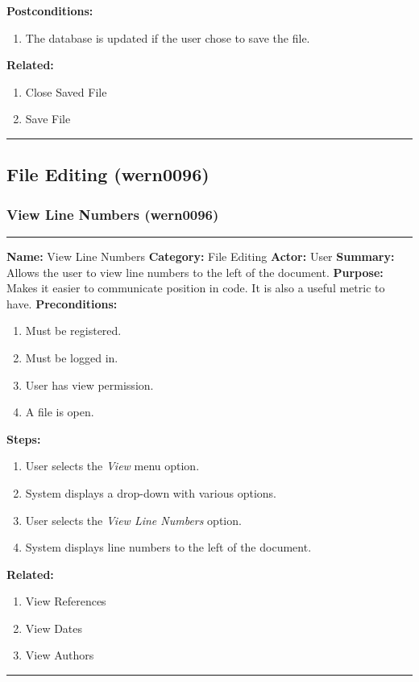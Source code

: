 \documentclass[11pt]{report}
\begin{document}
	\textbf{Postconditions:}
	\begin{enumerate}
		\item The database is updated if the user chose to save the file.
	\end{enumerate}
	\textbf{Related:}
	\begin{enumerate}
		\item Close Saved File
		\item Save File
	\end{enumerate}
\vspace{8pt}
\hrule
\newpage


\subsection{File Editing (wern0096)}
\subsubsection{View Line Numbers (wern0096)}
\vspace{2pt}
\hrule
\vspace{8pt}
	\noindent\textbf{Name:} View Line Numbers \newline
	\textbf{Category:} File Editing \newline
	\textbf{Actor:} User \newline
	\textbf{Summary:} Allows the user to view line numbers to the left of the document. \newline
	\textbf{Purpose:} Makes it easier to communicate position in code. It is also a useful metric to have.\newline
	\textbf{Preconditions:}
	\begin{enumerate}
		\item Must be registered.
		\item Must be logged in.
		\item User has view permission.
		\item A file is open.
	\end{enumerate}
	\textbf{Steps:}
	\begin{enumerate}
		\item User selects the \textit{View} menu option.
		\item System displays a drop-down with various options.
		\item User selects the \textit{View Line Numbers} option.
		\item System displays line numbers to the left of the document.
	\end{enumerate}
	\textbf{Related:}
	\begin{enumerate}
		\item View References
		\item View Dates
		\item View Authors
	\end{enumerate}
\vspace{8pt}
\hrule
\newpage
\end{document}
